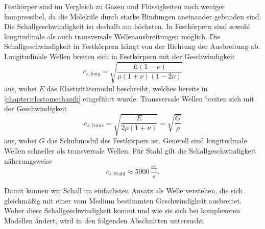 Festkörper sind im Vergleich zu Gasen und Flüssigkeiten noch weniger
kompressibel, da die Moleküle durch starke Bindungen aneinander gebunden sind.
Die Schallgeschwindigkeit ist deshalb am höchsten.
In Festkörpern sind sowohl longitudinale als auch transversale
Wellenausbreitungen möglich.
Die Schallgeschwindigkeit in Festkörpern hängt von der Richtung der
Ausbreitung ab.
Longitudinale Wellen breiten sich in Festkörpern mit der Geschwindigkeit
\begin{equation}
    c_{s,long} = \sqrt{\frac{E(1-\nu)}{\rho(1+\nu)(1-2\nu)}}
\end{equation}
aus, wobei $E$ das Elastizitätsmodul beschreibt, welches bereits in
\ref{chapter:elastomechanik} eingeführt wurde.
Transversale Wellen breiten sich mit der Geschwindigkeit
\begin{equation}
    c_{s,trans} = \sqrt{\frac{E}{2\rho(1+\nu)}} = \sqrt{\frac{G}{\rho}}
\end{equation}
aus, wobei $G$ das Schubmodul des Festkörpers ist.
Generell sind longitudinale Wellen schneller als transversale Wellen.
Für Stahl gilt die Schallgeschwindigkeit näherungsweise
\begin{equation}
    c_{s,\text{Stahl}} \approx 5000 \,\frac{\mathrm{m}}{\mathrm{s}}.
\end{equation}

Damit können wir Schall im einfachsten Ansatz als Welle verstehen, die
sich gleichmäßig mit einer vom Medium bestimmten Geschwindigkeit ausbreitet.
Woher diese Schallgeschwindigkeit kommt und wie sie sich bei
komplexeren Modellen ändert, wird in den folgenden Abschnitten untersucht.